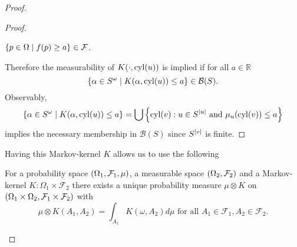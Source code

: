 \begin{proof}
\begin{proof}
\begin{theorem}
\begin{enumerate}
          $\left\{p\in\Omega\mid f(p) \geq a\right\}\in\mathcal{F}$.
      \end{enumerate}
    \end{theorem}
    Therefore the measurability of $K(\cdot, \operatorname{cyl}(u))$ is
    implied if for all $a\in\mathbb{R}$
    \begin{equation*}
      \left\{\alpha\in S^{\omega}\mid K(\alpha, \operatorname{cyl}(u))\leq a\right\}\in\mathcal{B}(S).
    \end{equation*}
    Observably,
    \begin{equation*}
      \left\{\alpha\in S^{\omega}\mid K(\alpha, \operatorname{cyl}(u))\leq a\right\} = 
        \bigcup\left\{
          \operatorname{cyl}(v):u\in S^{\left\vert{u}\right\vert}\text{ and }\mu_{u}(\operatorname{cyl}(v))\leq a
        \right\}
    \end{equation*}
    implies the necessary membership in $\mathcal{B}(S)$ since $S^{\left\vert{v}\right\vert}$ 
    is finite.
  \end{proof}
  Having this Markov-kernel $K$ allows us to use the following
  \begin{theorem}
    \cite[Korollar 14.23]{Klenke}
    For a probability space $\left(\Omega_{1}, \mathcal{F}_{1}, \mu\right)$, a
    measurable space $\left(\Omega_{2}, \mathcal{F}_{2}\right)$ and a Markov-kernel
    $K:\Omega_{1}\times\mathcal{F}_{2}$ there exists a unique probability 
    measure $\mu\otimes K$ on $\left(\Omega_{1}\times \Omega_{2}, 
    \mathcal{F}_{1}\times\mathcal{F}_{2}\right)$ with
    \begin{equation*}
      \mu\otimes K(A_{1}, A_{2}) = \int_{A_{1}} K(\omega, A_{2})d\mu
      \text{ for all }A_{1}\in\mathcal{F}_{1}, A_{2}\in\mathcal{F}_{2}.
    \end{equation*}
  \end{theorem}
  

\end{proof}
